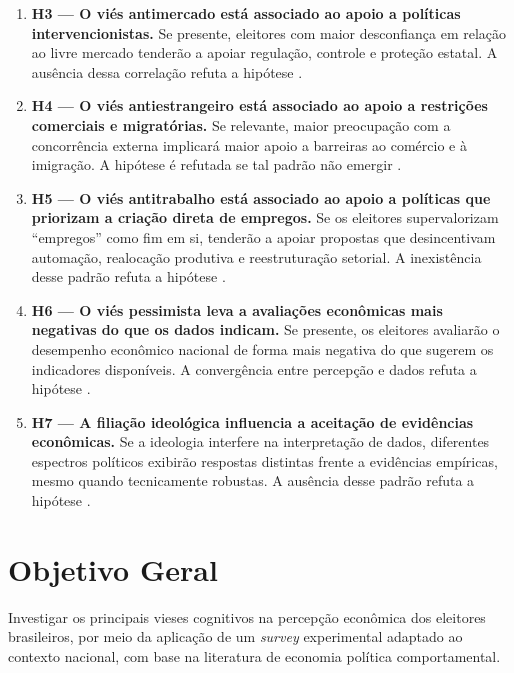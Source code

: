 \begin{enumerate}[label=\alph*)]
  \item \textbf{H3 — O viés antimercado está associado ao apoio a políticas intervencionistas.}
  Se presente, eleitores com maior desconfiança em relação ao livre mercado tenderão a apoiar regulação, controle e proteção estatal. A ausência dessa correlação refuta a hipótese \cite{The_Myth_of_the_Rational_Voter,sowell2004applied}.

  \item \textbf{H4 — O viés antiestrangeiro está associado ao apoio a restrições comerciais e migratórias.}
  Se relevante, maior preocupação com a concorrência externa implicará maior apoio a barreiras ao comércio e à imigração. A hipótese é refutada se tal padrão não emergir \cite{The_Myth_of_the_Rational_Voter,bhagwati2003free}.

  \item \textbf{H5 — O viés antitrabalho está associado ao apoio a políticas que priorizam a criação direta de empregos.}
  Se os eleitores supervalorizam “empregos” como fim em si, tenderão a apoiar propostas que desincentivam automação, realocação produtiva e reestruturação setorial. A inexistência desse padrão refuta a hipótese \cite{The_Myth_of_the_Rational_Voter,landsburg2012armchair}.

  \item \textbf{H6 — O viés pessimista leva a avaliações econômicas mais negativas do que os dados indicam.}
  Se presente, os eleitores avaliarão o desempenho econômico nacional de forma mais negativa do que sugerem os indicadores disponíveis. A convergência entre percepção e dados refuta a hipótese \cite{The_Myth_of_the_Rational_Voter,easterbrook2004progress}.

  \item \textbf{H7 — A filiação ideológica influencia a aceitação de evidências econômicas.}
  Se a ideologia interfere na interpretação de dados, diferentes espectros políticos exibirão respostas distintas frente a evidências empíricas, mesmo quando tecnicamente robustas. A ausência desse padrão refuta a hipótese \cite{The_Myth_of_the_Rational_Voter,kahan2012polarization}.

\end{enumerate}

\section{Objetivo Geral}\label{sec:objetivo-geral}

Investigar os principais vieses cognitivos na percepção econômica dos eleitores brasileiros, por meio da aplicação de um \textit{survey} experimental adaptado ao contexto nacional, com base na literatura de economia política comportamental.

